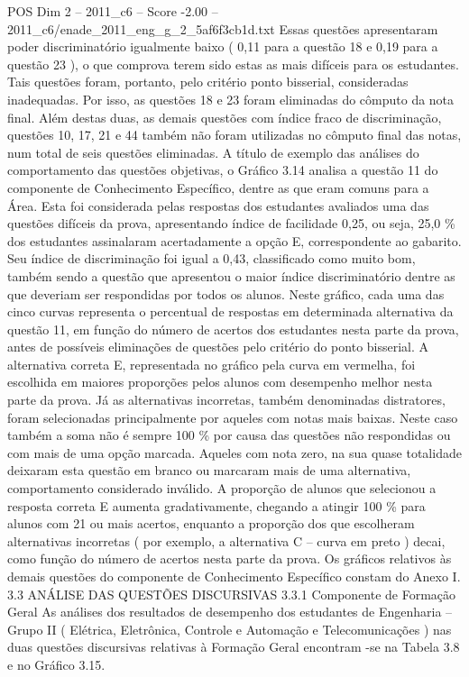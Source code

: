 \begin{textsample}{POS Dim 2 – 2011\_c6 – Score -2.00 – 2011\_c6/enade\_2011\_eng\_g\_2\_5af6f3cb1d.txt}
Essas questões apresentaram poder discriminatório igualmente baixo ( 0,11 para a questão 18 e 0,19 para a questão 23 ), o que comprova terem sido estas as mais difíceis para os estudantes.
Tais questões foram, portanto, pelo critério ponto bisserial, consideradas inadequadas.
Por isso, as questões 18 e 23 foram eliminadas do cômputo da nota final.
Além destas duas, as demais questões com índice fraco de discriminação, questões 10, 17, 21 e 44 também não foram utilizadas no cômputo final das notas, num total de seis questões eliminadas.
A título de exemplo das análises do comportamento das questões objetivas, o Gráfico 3.14 analisa a questão 11 do componente de Conhecimento Específico, dentre as que eram comuns para a Área.
Esta foi considerada pelas respostas dos estudantes avaliados uma das questões difíceis da prova, apresentando índice de facilidade 0,25, ou seja, 25,0 \% dos estudantes assinalaram acertadamente a opção E, correspondente ao gabarito.
Seu índice de discriminação foi igual a 0,43, classificado como muito bom, também sendo a questão que apresentou o maior índice discriminatório dentre as que deveriam ser respondidas por todos os alunos.
Neste gráfico, cada uma das cinco curvas representa o percentual de respostas em determinada alternativa da questão 11, em função do número de acertos dos estudantes nesta parte da prova, antes de possíveis eliminações de questões pelo critério do ponto bisserial.
A alternativa correta E, representada no gráfico pela curva em vermelha, foi escolhida em maiores proporções pelos alunos com desempenho melhor nesta parte da prova.
Já as alternativas incorretas, também denominadas distratores, foram selecionadas principalmente por aqueles com notas mais baixas.
Neste caso também a soma não é sempre 100 \% por causa das questões não respondidas ou com mais de uma opção marcada.
Aqueles com nota zero, na sua quase totalidade deixaram esta questão em branco ou marcaram mais de uma alternativa, comportamento considerado inválido.
A proporção de alunos que selecionou a resposta correta E aumenta gradativamente, chegando a atingir 100 \% para alunos com 21 ou mais acertos, enquanto a proporção dos que escolheram alternativas incorretas ( por exemplo, a alternativa C – curva em preto ) decai, como função do número de acertos nesta parte da prova.
Os gráficos relativos às demais questões do componente de Conhecimento Específico constam do Anexo I. 3.3 ANÁLISE DAS QUESTÕES DISCURSIVAS 3.3.1 Componente de Formação Geral As análises dos resultados de desempenho dos estudantes de Engenharia – Grupo II ( Elétrica, Eletrônica, Controle e Automação e Telecomunicações ) nas duas questões discursivas relativas à Formação Geral encontram -se na Tabela 3.8 e no Gráfico 3.15.

\end{textsample}
